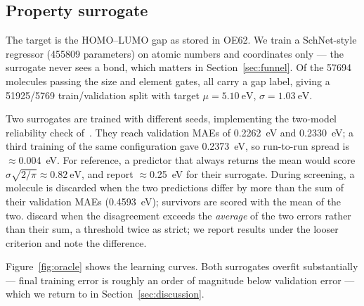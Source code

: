 \documentclass[runningheads]{llncs}
\begin{document}
\subsection{Property surrogate}

The target is the HOMO--LUMO gap as stored in OE62. We train a
SchNet-style regressor (\num{455809} parameters) on atomic numbers and
coordinates only --- the surrogate never sees a bond, which matters in
Section~\ref{sec:funnel}. Of the \num{57694} molecules passing the size
and element gates, all carry a gap label, giving a
\num{51925}/\num{5769} train/validation split with target
$\mu=\SI{5.10}{\electronvolt}$, $\sigma=\SI{1.03}{\electronvolt}$.

Two surrogates are trained with different seeds, implementing the
two-model reliability check of~\cite{westermayr2022}. They reach
validation MAEs of \SI{0.2262}{\electronvolt} and
\SI{0.2330}{\electronvolt}; a third training of the same configuration
gave \SI{0.2373}{\electronvolt}, so run-to-run spread is
$\approx$\SI{0.004}{\electronvolt}. For reference, a predictor that always returns the mean would score
$\sigma\sqrt{2/\pi}\approx\SI{0.82}{\electronvolt}$, and
\cite{westermayr2022} report $\approx$\SI{0.25}{\electronvolt} for their
surrogate. During screening, a molecule is discarded when the two
predictions differ by more than the sum of their validation MAEs
(\SI{0.4593}{\electronvolt}); survivors are scored with the mean of the
two. \cite{westermayr2022} discard when the disagreement exceeds the
\emph{average} of the two errors rather than their sum, a threshold twice
as strict; we report results under the looser criterion and note the
difference.

Figure~\ref{fig:oracle} shows the learning curves. Both surrogates
overfit substantially --- final training error is roughly an order of
magnitude below validation error --- which we return to in
Section~\ref{sec:discussion}.
\end{document}
